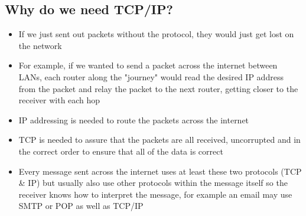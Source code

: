 \subsection*{Why do we need TCP/IP?}

\begin{itemize}
  \item If we just sent out packets without the protocol, they would just get lost on the network
  \item For example, if we wanted to send a packet across the internet between LANs, each router along the "journey" would read the desired IP address from the packet and relay the packet to the next router, getting closer to the receiver with each hop
  \item IP addressing is needed to route the packets across the internet
  \item TCP is needed to assure that the packets are all received, uncorrupted and in the correct order to ensure that all of the data is correct
  \item Every message sent across the internet uses at least these two protocols (TCP \& IP) but usually also use other protocols within the message itself so the receiver knows how to interpret the message, for example an email may use SMTP or POP as well as TCP/IP
\end{itemize}